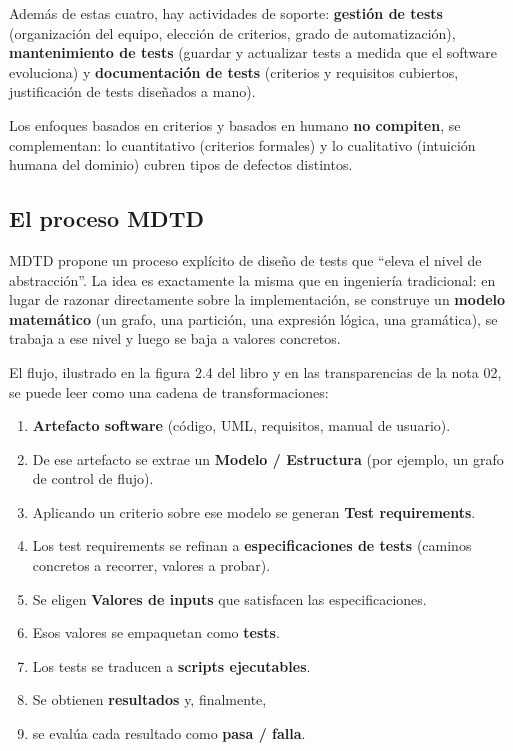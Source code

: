 \documentclass[12pt,a4paper]{article}
\begin{document}
Además de estas cuatro, hay actividades de soporte: \textbf{gestión de tests} (organización del equipo, elección de criterios, grado de automatización), \textbf{mantenimiento de tests} (guardar y actualizar tests a medida que el software evoluciona) y \textbf{documentación de tests} (criterios y requisitos cubiertos, justificación de tests diseñados a mano).

Los enfoques basados en criterios y basados en humano \textbf{no compiten}, se complementan: lo cuantitativo (criterios formales) y lo cualitativo (intuición humana del dominio) cubren tipos de defectos distintos.

\subsection{El proceso MDTD}
MDTD propone un proceso explícito de diseño de tests que ``eleva el nivel de abstracción''. La idea es exactamente la misma que en ingeniería tradicional: en lugar de razonar directamente sobre la implementación, se construye un \textbf{modelo matemático} (un grafo, una partición, una expresión lógica, una gramática), se trabaja a ese nivel y luego se baja a valores concretos.

El flujo, ilustrado en la figura 2.4 del libro y en las transparencias de la nota 02, se puede leer como una cadena de transformaciones:

\begin{enumerate}
  \item \textbf{Artefacto software} (código, UML, requisitos, manual de usuario).
  \item De ese artefacto se extrae un \textbf{Modelo / Estructura} (por ejemplo, un grafo de control de flujo).
  \item Aplicando un criterio sobre ese modelo se generan \textbf{Test requirements}.
  \item Los test requirements se refinan a \textbf{especificaciones de tests} (caminos concretos a recorrer, valores a probar).
  \item Se eligen \textbf{Valores de inputs} que satisfacen las especificaciones.
  \item Esos valores se empaquetan como \textbf{tests}.
  \item Los tests se traducen a \textbf{scripts ejecutables}.
  \item Se obtienen \textbf{resultados} y, finalmente,
  \item se evalúa cada resultado como \textbf{pasa / falla}.
\end{enumerate}
\end{document}
